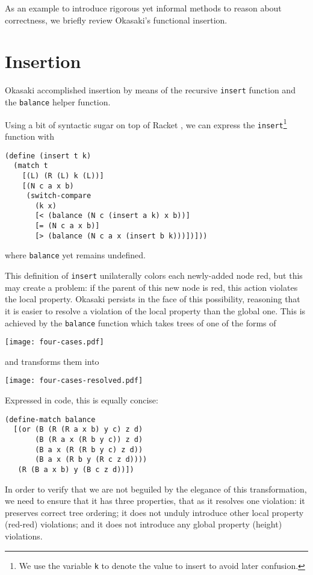 \documentclass[preprint]{sigplanconf}
\begin{document}
As an example to introduce rigorous yet informal methods to reason about correctness, we briefly review Okasaki's functional insertion.

\section{Insertion}

Okasaki accomplished insertion by means of the recursive \texttt{insert} function and the \texttt{balance} helper function.

Using a bit of syntactic sugar on top of Racket \cite{plt-tr1}, we can express the \texttt{insert}\footnote{We use the variable \texttt{k} to denote the value to insert to avoid later confusion.} function with
\begin{verbatim}
(define (insert t k)
  (match t
    [(L) (R (L) k (L))]
    [(N c a x b)
     (switch-compare
       (k x)
       [< (balance (N c (insert a k) x b))]
       [= (N c a x b)]
       [> (balance (N c a x (insert b k)))])]))
\end{verbatim}
where \texttt{balance} yet remains undefined.

This definition of \texttt{insert} unilaterally colors each newly-added node red, but this may create a problem: if the parent of this new node is red, this action violates the local property. Okasaki persists in the face of this possibility, reasoning that it is easier to resolve a violation of the local property than the global one. This is achieved by the \texttt{balance} function which takes trees of one of the forms of
\begin{center}
\texttt{[image: four-cases.pdf]}
\end{center}
and transforms them into
\begin{center}
\texttt{[image: four-cases-resolved.pdf]}
\end{center}
Expressed in code, this is equally concise:
\begin{verbatim}
(define-match balance
  [(or (B (R (R a x b) y c) z d)
       (B (R a x (R b y c)) z d)
       (B a x (R (R b y c) z d))
       (B a x (R b y (R c z d))))
   (R (B a x b) y (B c z d))])
\end{verbatim}

In order to verify that we are not beguiled by the elegance of this transformation, we need to ensure that it has three properties, that as it resolves one violation: it preserves correct tree ordering; it does not unduly introduce other local property (red-red) violations; and it does not introduce any global property (height) violations.
\end{document}
